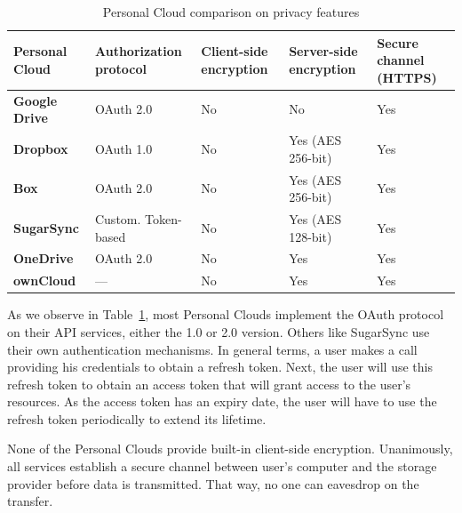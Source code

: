 {
\def\arraystretch{1.5}

\begin{table}
\begin{center}
    \begin{tabular}{ | p{3.3cm} | p{2.5cm} | p{2.2cm} | p{2.2cm} | p{2cm} | }
    \hline
    \rowcolor[gray]{0.8}

	\textbf{Personal Cloud} &
	\textbf{Authorization protocol} &
	\textbf{Client-side encryption} &
	\textbf{Server-side encryption} & 
	\textbf{Secure channel (HTTPS)} \\ \hline
	
	\textbf{Google Drive} &
	OAuth 2.0 &
	No &
	No &
	Yes \\ \hline

	\textbf{Dropbox} &
	OAuth 1.0 &
	No &
	Yes (AES 256-bit) &
	Yes \\ \hline
	
	\textbf{Box} &
	OAuth 2.0 &
	No &
	Yes (AES 256-bit) &
	Yes \\ \hline
	
	\textbf{SugarSync} & 
	Custom. Token-based &
	No &
	Yes (AES 128-bit) &
	Yes \\ \hline
	
	\textbf{OneDrive} & 
	OAuth 2.0 &
	No &
	Yes &
	Yes \\ \hline

	
	\textbf{ownCloud} &
	--- &
	No &
	Yes &
	Yes \\ \hline

    \end{tabular}
    \caption{Personal Cloud comparison on privacy features}
    \label{tab:pc_privacy}
\end{center}
\end{table}
}

As we observe in Table~\ref{tab:pc_privacy}, most Personal Clouds implement the OAuth protocol on their API services, either the 1.0 or 2.0 version. Others like SugarSync use their own authentication mechanisms. In general terms, a user makes a call providing his credentials to obtain a refresh token. Next, the user will use this refresh token to obtain an access token that will grant access to the user's resources. As the access token has an expiry date, the user will have to use the refresh token periodically to extend its lifetime.

None of the Personal Clouds provide built-in client-side encryption. Unanimously, all services establish a secure channel between user's computer and the storage provider before data is transmitted. That way, no one can eavesdrop on the transfer.

